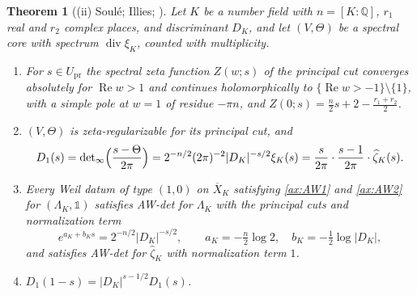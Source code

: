 \documentclass[11pt]{amsart}
\theoremstyle{plain}
\newtheorem{theorem}{Theorem}[section]
\theoremstyle{definition}
\theoremstyle{remark}
\numberwithin{equation}{section}
\newcommand{\Q}{\mathbb{Q}}
\newcommand{\Xbar}{\overline{X}}
\DeclareMathOperator{\divisor}{div}
\DeclareMathOperator{\Rea}{Re}
\newcommand{\detreg}{{\det}_{\infty}}
\renewcommand{\Re}{\Rea}
\begin{document}
\begin{theorem}[{(ii) Soul\'e; Illies;
\cite[Theorem~7.18(ii), p.~35]{Deninger1994Motivic}}]\label{thm:det-K}
Let $K$ be a number field with $n=[K:\Q]$, $r_1$ real and $r_2$
complex places, and discriminant $D_K$, and let $(V,\Theta)$ be a
spectral core with spectrum $\divisor\xi_K$, counted with multiplicity.
\begin{enumerate}[label=(\roman*)]
\item\label{item:dK-zeta} For $s\in U_{\mathrm{pr}}$ the spectral
  zeta function $Z(w;s)$ of the principal cut converges absolutely for
  $\Re w>1$ and continues holomorphically to
  $\{\Re w>-1\}\setminus\{1\}$, with a simple pole at $w=1$ of residue
  $-\pi n$, and
  $Z(0;s)=\tfrac n2s+2-\tfrac{r_1+r_2}2$.
\item\label{item:dK-det} $(V,\Theta)$ is zeta-regularizable for its
  principal cut, and
  \[
  D_1(s)=\detreg\Bigl(\frac{s-\Theta}{2\pi}\Bigr)
  =2^{-n/2}(2\pi)^{-2}|D_K|^{-s/2}\xi_K(s)
  =\frac s{2\pi}\cdot\frac{s-1}{2\pi}\cdot\widehat\zeta_K(s).
  \]
\item\label{item:dK-norm} Every Weil datum of type $(1,0)$ on $\Xbar_K$
  satisfying \ref{ax:AW1} and \ref{ax:AW2} for $(\Lambda_K,\mathbb 1)$
  satisfies AW-det for $\Lambda_K$ with the principal cuts and
  normalization term
  \[
  e^{a_K+b_Ks}=2^{-n/2}|D_K|^{-s/2},\qquad a_K=-\tfrac n2\log2,\quad
  b_K=-\tfrac12\log|D_K|,
  \]
  and satisfies AW-det for $\widehat\zeta_K$ with normalization term
  $1$.
\item\label{item:dK-fe} $D_1(1-s)=|D_K|^{s-1/2}D_1(s)$.
\end{enumerate}
\end{theorem}
\end{document}
